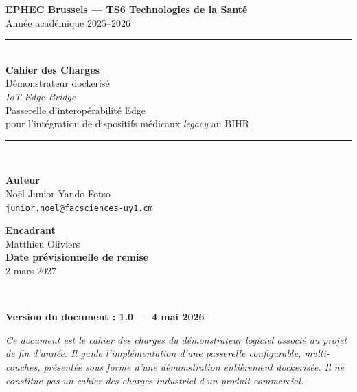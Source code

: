 
\thispagestyle{empty}

\begin{titlepage}
  \centering
  \vspace*{1.5cm}

  {\Large \textbf{EPHEC Brussels --- TS6 Technologies de la Santé}}\\[0.4cm]
  {\large Année académique 2025--2026}\\[2.5cm]

  \rule{\linewidth}{0.4pt}\\[0.4cm]
  {\Huge \textbf{Cahier des Charges}}\\[0.4cm]
  {\LARGE Démonstrateur dockerisé}\\[0.4cm]
  {\LARGE \textit{IoT Edge Bridge}}\\[0.2cm]
  {\large Passerelle d'interopérabilité Edge\\
  pour l'intégration de dispositifs médicaux \textit{legacy} au BIHR}\\[0.3cm]
  \rule{\linewidth}{0.4pt}\\[2.0cm]

  \begin{minipage}{0.45\linewidth}
    \begin{flushleft}
      \textbf{Auteur}\\
      Noël Junior Yando Fotso\\
      \texttt{junior.noel@facsciences-uy1.cm}
    \end{flushleft}
  \end{minipage}
  \hfill
  \begin{minipage}{0.45\linewidth}
    \begin{flushright}
      \textbf{Encadrant}\\
      Matthieu Oliviers\\
      \textbf{Date prévisionnelle de remise}\\
      2 mars 2027
    \end{flushright}
  \end{minipage}\\[2.5cm]

  \begin{center}
    \textbf{Version du document : 1.0 --- 4 mai 2026}
  \end{center}

  \vfill

  \footnotesize
  \textit{Ce document est le cahier des charges du démonstrateur logiciel
  associé au projet de fin d'année. Il guide l'implémentation d'une
  passerelle configurable, multi-couches, présentée sous forme d'une
  démonstration entièrement dockerisée. Il ne constitue pas un cahier
  des charges industriel d'un produit commercial.}
\end{titlepage}

